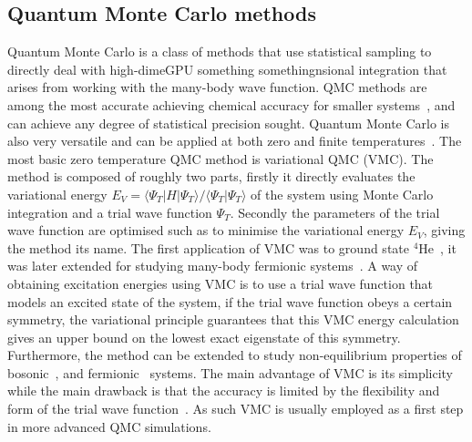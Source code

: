 \documentclass[final,3p,times,twocolumn]{elsarticle}
\begin{document}
	\subsection{Quantum Monte Carlo methods}
	\label{subsec:intro-QMC}
	Quantum Monte Carlo is a class of methods that use statistical sampling to directly deal with high-dimeGPU something somethingnsional integration that arises from working with the many-body wave function. QMC methods are among the most accurate achieving chemical accuracy for smaller systems~\cite{foulkes2001quantum}, and can achieve any degree of statistical precision sought. Quantum Monte Carlo is also very versatile and can be applied at both zero and finite temperatures~\cite{austin2012quantum}.	
		The most basic zero temperature QMC method is variational QMC (VMC). The method is composed of roughly two parts, firstly it directly evaluates the variational energy $E_V = \langle \Psi_{T} | H | \Psi_{T} \rangle / \langle \Psi_{T} | \Psi_{T} \rangle$ of the system using Monte Carlo integration and a trial wave function $\Psi_{T}$. Secondly the parameters of the trial wave function are optimised such as to minimise the variational energy $E_V$, giving the method its name. The first application of VMC was to ground state ${}^4$He~\cite{mcmillan1965ground}, it was later extended for studying many-body fermionic systems~\cite{ceperley1977monte}. A way of obtaining excitation energies using VMC is to use a trial wave function that models an excited state of the system, if the trial wave function obeys a certain symmetry, the variational principle guarantees that this VMC energy calculation gives an upper bound on the lowest exact eigenstate of this symmetry. Furthermore, the method can be extended to study non-equilibrium properties of bosonic~\cite{carleo2012localization, carleo2014light}, and fermionic~\cite{ido2015time} systems. The main advantage of VMC is its simplicity while the main drawback is that the accuracy is limited by the flexibility and form of the trial wave function~\cite{austin2012quantum}. As such VMC is usually employed as a first step in more advanced QMC simulations. 
		
\end{document}
